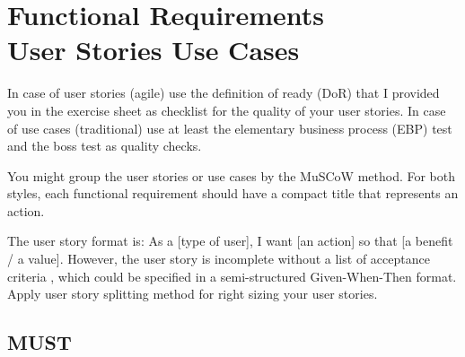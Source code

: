 \documentclass[conference,a4paper]{cs-techrep}
\begin{document}
\section{Functional Requirements \textbar{}\\User Stories \textbar{} Use Cases}

In case of user stories (agile) use the definition of ready (DoR) \faWarning{} that I provided you in the exercise sheet as checklist for the quality of your user stories. In case of use cases (traditional) use at least the elementary business process (EBP) test and the boss test as quality checks.

You might group the user stories or use cases by the MuSCoW \faWarning{} method.
For both styles, each functional requirement should have a compact title that represents an action.

The user story format \faWarning{} is: As a [type of user], I want [an action] so that [a benefit / a value]. However, the user story is incomplete without a list of acceptance criteria \faWarning{}, which could be specified in a semi-structured Given-When-Then format. Apply user story splitting \faWarning{} method for right sizing your user stories.

\subsection{MUST}
\end{document}
